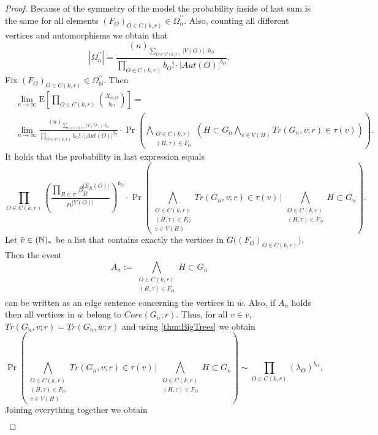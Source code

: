 \documentclass[12pt,notitlepage,a4paper]{article}
\theoremstyle{definition}
\newcommand{\N}{\mathbb{N}}
\newcommand{\Ln}{\lim\limits_{n\to \infty}}
\newcommand{\overbar}[1]{\mkern 1.5mu\overline{\mkern-1.5mu#1\mkern-1.5mu}\mkern 1.5mu}
\begin{document}
\begin{proof}
	Because of the symmetry of the model the probability inside of last sum 
	is the same for all elements $(F_O)_{O\in C(k,r)}\in \Omega_n^{\prime\prime}$.
	Also, counting all different vertices and automorphisms we obtain that
	\[
	|\Omega_n^{\prime\prime}|=
	\frac{(n)_{\sum_{O\in C(k,r)} |V(O)|\cdot b_O}}
	{\prod_{O\in C(k,r)} b_O!\cdot |Aut(O)|^{b_O}}.
	\]
	Fix $(F_O)_{O\in C(k,r)}\in \Omega_\N^{\prime\prime}$. Then 
	\begin{align*}
	&\Ln \mathrm{E}\left[
	\prod_{O\in C(k,r)}
	\binom{X_{n,O}}{b_O}
	\right]=\\
	&
	\Ln
	\frac{(n)_{\sum_{O\in C(k,r)} |V(O)|\cdot b_O}}
	{\prod_{O\in C(k,r)} b_O!\cdot |Aut(O)|^{b_O}} \cdot
	\Pr\left(
	\bigwedge_{
		\substack{
			O\in C(k,r)\\
			(H,\tau)\in F_O
	}}
	\left(
	H\subset G_n
	\bigwedge_{v\in V(H)}
	Tr(G_n,v;r)\in \tau(v)
	\right)
	\right).
	\end{align*}
	It holds that the probability in last expression equals
	\[
	\prod_{O\in C(k,r)}
	\left( 
	\frac{\prod_{R\in \sigma} \beta_R^{|E_R(O)|}}{n^{|V(O)|}}
	\right)^{b_O} \cdot
	\Pr\left(
	\bigwedge_{
		\substack{
			O\in C(k,r)\\
			(H,\tau)\in F_O\\
			v\in V(H)
	}}
	Tr(G_n,v;r)\in \tau(v) \,
	\Bigg|  \,
	\bigwedge_{
		\substack{
			O\in C(k,r)\\
			(H,\tau)\in F_O\\
		}}
	H\subset G_n
	\right).
	\]
	Let $\overbar{v}\in (\N)_*$ be 
	a list that contains exactly the vertices in $G\big(
	(F_O)_{O\in C(k,r)}	\big)$. Then the event
	\[
	A_n:=
		\bigwedge_{
		\substack{
			O\in C(k,r)\\
			(H,\tau)\in F_O\\
	}}
	H\subset G_n
	\]
	can be written as an edge sentence concerning the vertices in $\overline{w}$.
	Also, if $A_n$ holds then all vertices in $\overline{w}$ belong to 
	$Core(G_n;r)$. Thus, for all $v\in \overline{v}$,
	$Tr(G_n,v;r)=Tr(G_n,\overline{w};r)$ and using \cref{thm:BigTrees}
	we obtain
	\[
	\Pr\left(
	\bigwedge_{
		\substack{
			O\in C(k,r)\\
			(H,\tau)\in F_O\\
			v\in V(H)
	}}
	Tr(G_n,v;r)\in \tau(v) \,
	\Bigg|  \,
	\bigwedge_{
		\substack{
			O\in C(k,r)\\
			(H,\tau)\in F_O\\
	}}
	H\subset G_n
	\right) \sim
	\prod_{O\in C(k,r)} (\lambda_O)^{b_O}.	
	\]
	Joining everything together we obtain
	\begin{align*}

\end{align*}
\end{proof}
\end{document}
